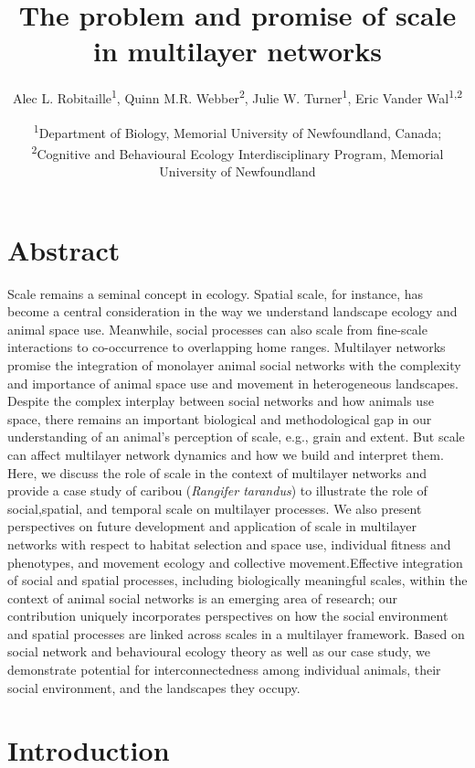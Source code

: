 \documentclass[]{article}
\title{The problem and promise of scale in multilayer networks}
\author{Alec L. Robitaille\textsuperscript{1}, Quinn M.R. Webber\textsuperscript{2}, Julie W. Turner\textsuperscript{1}, Eric Vander Wal\textsuperscript{1,2}}
\date{\textsuperscript{1}Department of Biology, Memorial University of Newfoundland, Canada; \textsuperscript{2}Cognitive and Behavioural Ecology Interdisciplinary Program, Memorial University of Newfoundland}
\begin{document}
\maketitle

{
\setcounter{tocdepth}{2}
\tableofcontents
}
\hypertarget{abstract}{%
\section{Abstract}\label{abstract}}

Scale remains a seminal concept in ecology. Spatial scale, for instance, has
become a central consideration in the way we understand landscape ecology and
animal space use. Meanwhile, social processes can also scale from fine-scale
interactions to co-occurrence to overlapping home ranges. Multilayer networks
promise the integration of monolayer animal social networks with the complexity
and importance of animal space use and movement in heterogeneous landscapes.
Despite the complex interplay between social networks and how animals use space,
there remains an important biological and methodological gap in our
understanding of an animal's perception of scale, e.g., grain and extent. But
scale can affect multilayer network dynamics and how we build and interpret
them. Here, we discuss the role of scale in the context of multilayer networks
and provide a case study of caribou (\emph{Rangifer tarandus}) to illustrate the role
of social,spatial, and temporal scale on multilayer processes. We also present
perspectives on future development and application of scale in multilayer
networks with respect to habitat selection and space use, individual fitness and
phenotypes, and movement ecology and collective movement.Effective integration
of social and spatial processes, including biologically meaningful scales,
within the context of animal social networks is an emerging area of research;
our contribution uniquely incorporates perspectives on how the social
environment and spatial processes are linked across scales in a multilayer
framework. Based on social network and behavioural ecology theory as well as our
case study, we demonstrate potential for interconnectedness among individual
animals, their social environment, and the landscapes they occupy.

\hypertarget{introduction}{%
\section{Introduction}\label{introduction}}
\end{document}
